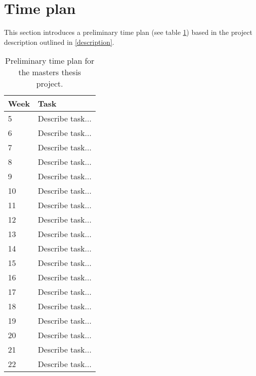 \section{Time plan}

This section introduces a preliminary time plan (see table \ref{timeline:time_plan}) based in the project description outlined in \ref{description}.

\begin{table}
  \centering
  \begin{tabularx}{\textwidth}{|l|X|}
    \hline
    Week & Task \\
    \hline
    5 & Describe task... \\
    6 & Describe task... \\
    7 & Describe task... \\
    8 & Describe task... \\
    9 & Describe task... \\
    10 & Describe task... \\
    11 & Describe task... \\
    12 & Describe task... \\
    13 & Describe task... \\
    14 & Describe task... \\
    15 & Describe task... \\
    16 & Describe task... \\
    17 & Describe task... \\
    18 & Describe task... \\
    19 & Describe task... \\
    20 & Describe task... \\
    21 & Describe task... \\
    22 & Describe task... \\
    \hline
  \end{tabularx}
  \caption{Preliminary time plan for the masters thesis project.}
  \label{timeline:time_plan}
\end{table}